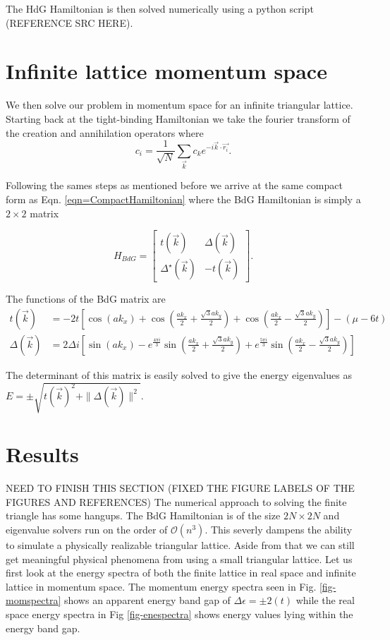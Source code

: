 The HdG Hamiltonian is then solved numerically using a python script (REFERENCE SRC HERE). 
\section{Infinite lattice momentum space}
We then solve our problem in momentum space for an infinite triangular lattice. Starting back at the tight-binding Hamiltonian we take the fourier transform of the creation and annihilation operators where
\begin{equation}
  c_i = \frac{1}{\sqrt{N}} \sum\limits_{\vec{k}} c_k e^{-i\vec{k}\cdot\vec{r_i}}.
\end{equation}

Following the sames steps as mentioned before we arrive at the same compact form as Eqn. \ref{eqn=CompactHamiltonian} where the BdG Hamiltonian is simply a $2\times2$ matrix 

\[
H_{BdG}=
  \begin{bmatrix}
   t(\vec{k}) & \Delta(\vec{k})\\
   \Delta^{\star}(\vec{k}) & -t(\vec{k})
  \end{bmatrix}.
\]

The functions of the BdG matrix are 
\begin{align}
t(\vec{k}) &= -2t\left[\cos(ak_x) + \cos\left(\frac{ak_x}{2}+\frac{\sqrt{3}ak_y}{2}\right) + \cos\left(\frac{ak_x}{2}-\frac{\sqrt{3}ak_y}{2}\right)\right] - (\mu - 6t) \\
\Delta(\vec{k}) &= 2\Delta i \left[\sin(ak_x)-e^{\frac{4\pi i}{3}}\sin\left(\frac{ak_x}{2}+\frac{\sqrt{3}ak_y}{2}\right) + e^{\frac{5\pi i}{3}}\sin\left(\frac{ak_x}{2}-\frac{\sqrt{3}ak_y}{2}\right)  \right]
\end{align}

The determinant of this matrix is easily solved to give the energy eigenvalues as $E = \pm\sqrt{t(\vec{k})^2 + \|\Delta(\vec{k})\|^2 }$.

\section{Results}
NEED TO FINISH THIS SECTION (FIXED THE FIGURE LABELS OF THE FIGURES AND REFERENCES)
The numerical approach to solving the finite triangle has some hangups. The BdG Hamiltonian is of the size $ 2N \times 2N $ and eigenvalue solvers run on the order of $\mathcal{O}(n^3)$. This severly dampens the ability to simulate a physically realizable triangular lattice. Aside from that we can still get meaningful physical phenomena from using a small triangular lattice. Let us first look at the energy spectra of both the finite lattice in real space and infinite lattice in momentum space. The momentum energy spectra seen in Fig. \ref{fig-momspectra} shows an apparent energy band gap of $\Delta\epsilon = \pm2(t)$ while the real space energy spectra in Fig \ref{fig-enespectra} shows energy values lying within the energy band gap.

